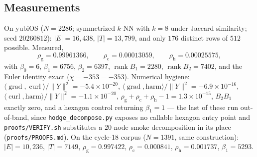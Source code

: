 \documentclass[11pt,a4paper]{article}
\theoremstyle{plain}
\theoremstyle{remark}
\theoremstyle{plain}
\begin{document}
\subsection{Measurements}

On yubiOS ($N=2286$; symmetrized $k$-NN with $k=8$ under Jaccard similarity; seed $20260812$): $|E|=16{,}438$, $|T|=13{,}799$, and only $176$ distinct rows of $512$ possible. Measured,
\begin{equation}
\rho_{\mathrm g}=0.99961366,\qquad \rho_{\mathrm c}=0.00013059,\qquad \rho_{\mathrm h}=0.00025575,
\label{eq:rho-measured}
\end{equation}
with $\beta_0=6$, $\beta_1=6756$, $\beta_2=6397$, $\operatorname{rank}B_1=2280$, $\operatorname{rank}B_2=7402$, and the Euler identity exact ($\chi=-353=-353$). Numerical hygiene: $\langle\operatorname{grad},\operatorname{curl}\rangle/\|Y\|^2=-5.4\times10^{-20}$, $\langle\operatorname{grad},\mathrm{harm}\rangle/\|Y\|^2=-6.9\times10^{-16}$, $\langle\operatorname{curl},\mathrm{harm}\rangle/\|Y\|^2=-1.1\times10^{-20}$, $\rho_{\mathrm g}+\rho_{\mathrm c}+\rho_{\mathrm h}-1=1.3\times10^{-15}$, $B_2B_1$ exactly zero, and a hexagon control returning $\beta_1=1$ --- the last of these run out-of-band, since \texttt{hodge\_decompose.py} exposes no callable hexagon entry point and \texttt{proofs/VERIFY.sh} substitutes a $20$-node smoke decomposition in its place (\texttt{proofs/PROOFS.md}). On the cycle-18 corpus ($N=1391$, same construction): $|E|=10{,}236$, $|T|=7149$, $\rho_{\mathrm g}=0.997422$, $\rho_{\mathrm c}=0.000841$, $\rho_{\mathrm h}=0.001737$, $\beta_1=5293$.
\end{document}
